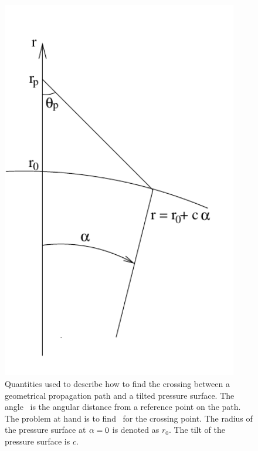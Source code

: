 \begin{figure}
 \begin{minipage}[c]{0.45\textwidth}
 \includegraphics*[width=0.92\textwidth]{psurf_crossing}
 \end{minipage}%
 \begin{minipage}[c]{0.55\textwidth}
  \caption{Quantities used to describe how to find the crossing between a 
    geometrical propagation path and a tilted pressure surface. The
    angle \Lat\ is the angular distance from a reference point on the
    path. The problem at hand is to find \Lat\ for the crossing
    point. The radius of the pressure surface at $\alpha = 0$ is
    denoted as $r_0$. The tilt of the pressure surface is $c$.}
  \label{fig:ppath:psurf_crossing}
 \end{minipage}%
\end{figure}   

